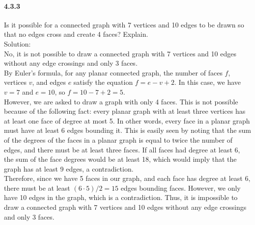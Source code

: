 \documentclass{article}
\begin{document}
\paragraph{4.3.3}
Is it possible for a connected graph with 7 vertices and 10 edges to be drawn so that no edges cross and create 4 faces? Explain.\\
Solution:\\
No, it is not possible to draw a connected graph with 7 vertices and 10 edges without any edge crossings and only 3 faces.\\
By Euler's formula, for any planar connected graph, the number of faces $f$, vertices $v$, and edges $e$ satisfy the equation $f = e - v + 2$. In this case, we have $v=7$ and $e=10$, so $f = 10 - 7 + 2 = 5$.\\
However, we are asked to draw a graph with only 4 faces. This is not possible because of the following fact: every planar graph with at least three vertices has at least one face of degree at most 5. In other words, every face in a planar graph must have at least 6 edges bounding it. This is easily seen by noting that the sum of the degrees of the faces in a planar graph is equal to twice the number of edges, and there must be at least three faces. If all faces had degree at least 6, the sum of the face degrees would be at least 18, which would imply that the graph has at least 9 edges, a contradiction.\\
Therefore, since we have 5 faces in our graph, and each face has degree at least 6, there must be at least $(6\cdot 5)/2=15$ edges bounding faces. However, we only have 10 edges in the graph, which is a contradiction. Thus, it is impossible to draw a connected graph with 7 vertices and 10 edges without any edge crossings and only 3 faces.
\end{document}
